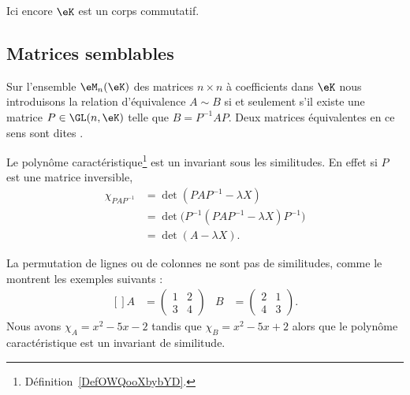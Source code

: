 Ici encore \( \eK\) est un corps commutatif.

\subsection{Matrices semblables}

\begin{definition} \label{DefCQNFooSDhDpB}
    Sur l'ensemble \( \eM_n(\eK)\) des matrices \( n\times n\) à coefficients dans \(\eK\) nous introduisons la relation d'équivalence \( A\sim B\) si et seulement s'il existe une matrice \( P\in\GL(n,\eK)\) telle que \( B=P^{-1}AP\). Deux matrices équivalentes en ce sens sont dites .
\end{definition}

Le polynôme caractéristique\footnote{Définition~\ref{DefOWQooXbybYD}.} est un invariant sous les similitudes. En effet si \( P\) est une matrice inversible,
\begin{subequations}
    \begin{align}
        \chi_{PAP^{-1}}&=\det(PAP^{-1}-\lambda X)\\
        &=\det\big( P^{-1}(PAP^{-1}-\lambda X)P^{-1} \big)\\
        &=\det(A-\lambda X).
    \end{align}
\end{subequations}

La permutation de lignes ou de colonnes ne sont pas de similitudes, comme le montrent les exemples suivants :
\begin{equation}
    \begin{aligned}[]
        A&=\begin{pmatrix}
            1    &   2    \\
            3    &   4
        \end{pmatrix}&
        B&=\begin{pmatrix}
            2    &   1    \\
            4    &   3
        \end{pmatrix}.
    \end{aligned}
\end{equation}
Nous avons \( \chi_A=x^2-5x-2\) tandis que \( \chi_B=x^2-5x+2\) alors que le polynôme caractéristique est un invariant de similitude.

